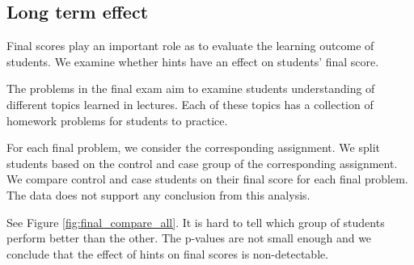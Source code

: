 \documentclass{llncs2e/llncs}
\begin{document}
\subsection{Long term effect}
Final scores play an important role as to evaluate the learning outcome of students. We examine whether hints have an effect on students' final score.

The problems in the final exam aim to examine students understanding of different topics learned in lectures. Each of these topics has a collection of homework problems for students to practice.

For each final problem, we consider the corresponding assignment. We split students based on the control and case group of the corresponding assignment. We compare control and case students on their final score for each final problem. The data does not support any conclusion from this analysis.

\iffalse
See Figure \ref{fig:final_compare_all}. It is hard to tell which group of students perform better than the other. The p-values are not small enough and we conclude that the effect of hints on final scores is non-detectable.
\end{document}
